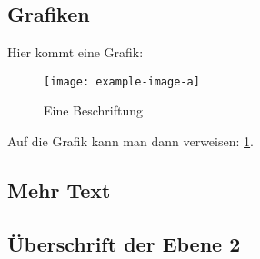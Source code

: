 \documentclass[]{cid}
\begin{document}
\subsection{Grafiken}
Hier kommt eine Grafik:
\begin{figure}
   \texttt{[image: example-image-a]}
   \caption{Eine Beschriftung}
   \label{fig:Beispielgrafik}
\end{figure}

Auf die Grafik kann man dann verweisen: \cref{fig:Beispielgrafik}.

\subsection{Mehr Text}
\blindtext[18]

\subsection{Überschrift der Ebene 2}
\blindtext[5]

\printbibliography
\end{document}
